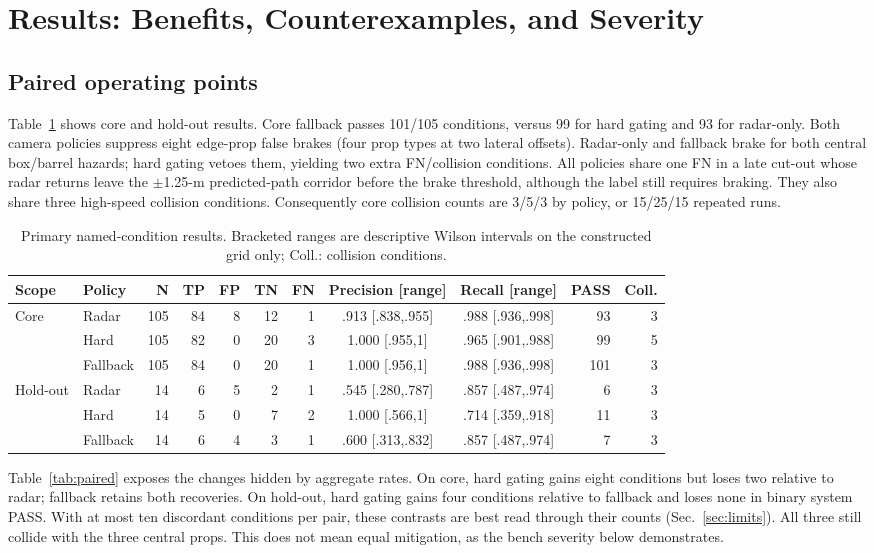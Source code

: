 \documentclass[conference]{IEEEtran}
\begin{document}
\section{Results: Benefits, Counterexamples, and Severity}
\subsection{Paired operating points}
Table~\ref{tab:primary} shows core and hold-out results.
Core fallback passes 101/105 conditions, versus 99 for hard gating and 93 for
radar-only. Both camera policies suppress eight edge-prop false brakes (four
prop types at two lateral offsets). Radar-only and fallback brake for both
central box/barrel hazards; hard gating vetoes them, yielding two extra
FN/collision conditions. All policies share one FN in a late cut-out whose radar returns leave the
$\pm$1.25-m predicted-path corridor before the brake threshold, although the
label still requires braking. They also share three high-speed collision
conditions. Consequently core collision
counts are 3/5/3 by policy, or 15/25/15 repeated runs.

\begin{table}[t]
\caption{Primary named-condition results. Bracketed ranges are descriptive Wilson intervals on the constructed grid only; Coll.: collision conditions.}
\label{tab:primary}
\centering\scriptsize
\setlength{\tabcolsep}{3pt}
\begin{tabular}{llrrrrrccrr}
\toprule Scope & Policy & N & TP & FP & TN & FN & Precision [range] & Recall [range] & PASS & Coll.\\
\midrule
Core & Radar & 105 & 84 & 8 & 12 & 1 & .913 [.838,.955] & .988 [.936,.998] & 93 & 3\\
 & Hard & 105 & 82 & 0 & 20 & 3 & 1.000 [.955,1] & .965 [.901,.988] & 99 & 5\\
 & Fallback & 105 & 84 & 0 & 20 & 1 & 1.000 [.956,1] & .988 [.936,.998] & 101 & 3\\
\midrule
Hold-out & Radar & 14 & 6 & 5 & 2 & 1 & .545 [.280,.787] & .857 [.487,.974] & 6 & 3\\
 & Hard & 14 & 5 & 0 & 7 & 2 & 1.000 [.566,1] & .714 [.359,.918] & 11 & 3\\
 & Fallback & 14 & 6 & 4 & 3 & 1 & .600 [.313,.832] & .857 [.487,.974] & 7 & 3\\
\bottomrule
\end{tabular}
\end{table}

Table~\ref{tab:paired} exposes the changes hidden by aggregate rates. On core,
hard gating gains eight conditions but loses two relative to radar; fallback
retains both recoveries. On hold-out, hard gating gains four conditions relative
to fallback and loses none in binary system PASS. With at most ten discordant
conditions per pair, these contrasts are best read through their counts
(Sec.~\ref{sec:limits}). All three
still collide with the three central props. This does not mean equal mitigation, as the bench
severity below demonstrates.
\end{document}

